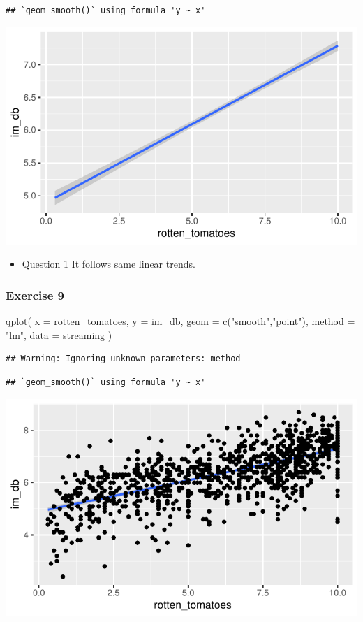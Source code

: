 \documentclass[
  11pt,
]{article}
\newenvironment{Shaded}{\begin{snugshade}}{\end{snugshade}}
\newcommand{\AttributeTok}[1]{\textcolor[rgb]{0.77,0.63,0.00}{#1}}
\newcommand{\FunctionTok}[1]{\textcolor[rgb]{0.00,0.00,0.00}{#1}}
\newcommand{\NormalTok}[1]{#1}
\newcommand{\StringTok}[1]{\textcolor[rgb]{0.31,0.60,0.02}{#1}}
\providecommand{\tightlist}{%
  \setlength{\itemsep}{0pt}\setlength{\parskip}{0pt}}
\begin{document}
\begin{verbatim}
## `geom_smooth()` using formula 'y ~ x'
\end{verbatim}

\begin{center}\includegraphics[width=0.8\linewidth]{lab02_files/figure-latex/unnamed-chunk-7-1} \end{center}

\begin{itemize}
\tightlist
\item
  Question 1 It follows same linear trends.
\end{itemize}

\hypertarget{exercise-9}{%
\subsubsection{Exercise 9}\label{exercise-9}}

\begin{Shaded}
\begin{Highlighting}[]
\FunctionTok{qplot}\NormalTok{(}
  \AttributeTok{x =}\NormalTok{ rotten\_tomatoes, }
  \AttributeTok{y =}\NormalTok{ im\_db, }
  \AttributeTok{geom =} \FunctionTok{c}\NormalTok{(}\StringTok{"smooth"}\NormalTok{,}\StringTok{"point"}\NormalTok{), }
  \AttributeTok{method =} \StringTok{"lm"}\NormalTok{, }
  \AttributeTok{data =}\NormalTok{ streaming}
\NormalTok{  )}
\end{Highlighting}
\end{Shaded}

\begin{verbatim}
## Warning: Ignoring unknown parameters: method
\end{verbatim}

\begin{verbatim}
## `geom_smooth()` using formula 'y ~ x'
\end{verbatim}

\begin{center}\includegraphics[width=0.8\linewidth]{lab02_files/figure-latex/unnamed-chunk-8-1} \end{center}
\end{document}
